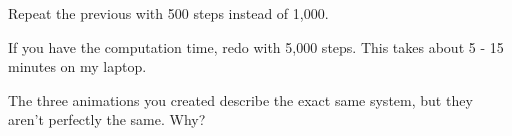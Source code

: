 \documentclass[11pt,letterpaper]{article}
\begin{document}
\begin{problem}
 Repeat the previous with 500 steps instead of 1,000.
\end{problem}

\begin{problem}
 If you have the computation time, redo with 5,000 steps. This takes about 5 - 15 minutes on my
laptop.
\end{problem}

\begin{problem}
 The three animations you created describe the exact same system, but they aren't perfectly the same.
Why?
\end{problem}
\end{document}
